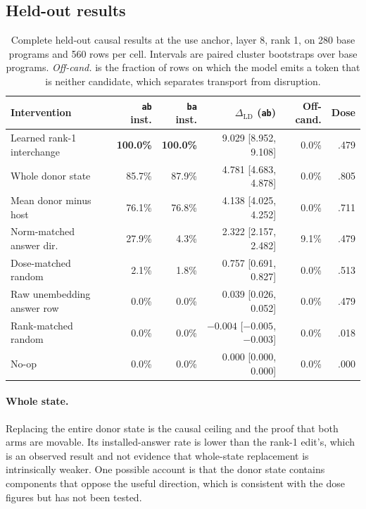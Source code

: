 \documentclass{article}
\begin{document}
\subsection{Held-out results}

\begin{table}[htbp]
\centering
\small
\caption{Complete held-out causal results at the use anchor, layer 8, rank 1, on 280 base programs and 560 rows per cell. Intervals are paired cluster bootstraps over base programs. \emph{Off-cand.} is the fraction of rows on which the model emits a token that is neither candidate, which separates transport from disruption.}
\label{tab:app-causal}
\begin{tabular}{lrrrrr}
\toprule
Intervention & \texttt{ab} inst. & \texttt{ba} inst. & $\Delta_{\mathrm{LD}}$ (\texttt{ab}) & Off-cand. & Dose \\
\midrule
Learned rank-1 interchange & \textbf{100.0\%} & \textbf{100.0\%} & 9.029 [8.952, 9.108] & 0.0\% & .479 \\
Whole donor state          & 85.7\% & 87.9\% & 4.781 [4.683, 4.878] & 0.0\% & .805 \\
Mean donor minus host      & 76.1\% & 76.8\% & 4.138 [4.025, 4.252] & 0.0\% & .711 \\
Norm-matched answer dir.   & 27.9\% & 4.3\%  & 2.322 [2.157, 2.482] & 9.1\% & .479 \\
Dose-matched random        & 2.1\%  & 1.8\%  & 0.757 [0.691, 0.827] & 0.0\% & .513 \\
Raw unembedding answer row & 0.0\%  & 0.0\%  & 0.039 [0.026, 0.052] & 0.0\% & .479 \\
Rank-matched random        & 0.0\%  & 0.0\%  & $-0.004$ [$-0.005$, $-0.003$] & 0.0\% & .018 \\
No-op                      & 0.0\%  & 0.0\%  & 0.000 [0.000, 0.000] & 0.0\% & .000 \\
\bottomrule
\end{tabular}
\end{table}

\paragraph{Whole state.}
Replacing the entire donor state is the causal ceiling and the proof that both arms are movable. Its installed-answer rate is lower than the rank-1 edit's, which is an observed result and not evidence that whole-state replacement is intrinsically weaker. One possible account is that the donor state contains components that oppose the useful direction, which is consistent with the dose figures but has not been tested.
\end{document}
